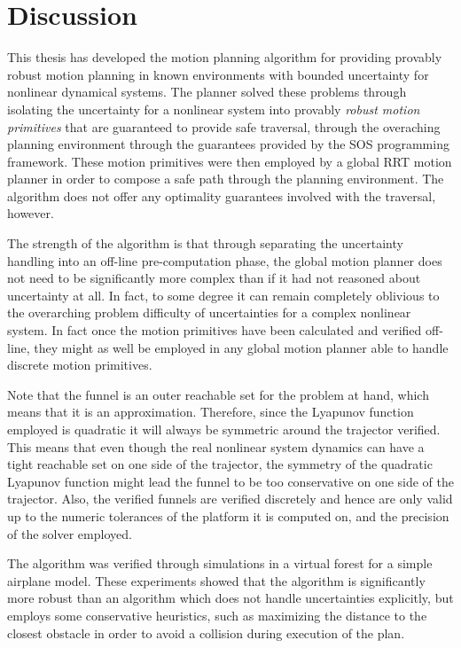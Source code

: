 \chapter{Discussion}
\label{chp:discussion}

This thesis has developed the \rrtfunnel{} motion planning algorithm for
providing provably robust motion planning in known environments with bounded
uncertainty for nonlinear dynamical systems. The planner solved these problems
through isolating the uncertainty for a nonlinear system into provably
\textit{robust motion primitives} that are guaranteed to provide safe traversal,
through the overaching planning environment through the guarantees provided by
the \ac{SOS} programming framework. These motion primitives were then employed
by a global \ac{RRT} motion planner in order to compose a safe path through the
planning environment. The algorithm does not offer any optimality guarantees
involved with the traversal, however.


The strength of the algorithm is that through separating the uncertainty
handling into an off-line pre-computation phase, the global motion planner does
not need to be significantly more complex than if it had not reasoned about
uncertainty at all. In fact, to some degree it can remain completely oblivious
to the overarching problem difficulty of uncertainties for a complex nonlinear
system. In fact once the motion primitives have been calculated and verified
off-line, they might as well be employed in any global motion planner able to
handle discrete motion primitives.


Note that the funnel is an outer reachable set for the problem at hand, which
means that it is an approximation. Therefore, since the Lyapunov function
employed is quadratic it will always be symmetric around the trajector verified.
This means that even though the real nonlinear system dynamics can have a tight
reachable set on one side of the trajector, the symmetry of the quadratic
Lyapunov function might lead the funnel to be too conservative on one side of
the trajector. Also, the verified funnels are verified discretely and hence are
only valid up to the numeric tolerances of the platform it is computed on, and
the precision of the solver employed.


The algorithm was verified through simulations in a virtual forest for a simple
airplane model. These experiments showed that the \rrtfunnel{} algorithm is
significantly more robust than an algorithm which does not handle uncertainties
explicitly, but employs some conservative heuristics, such as maximizing the
distance to the closest obstacle in order to avoid a collision during execution
of the plan.


